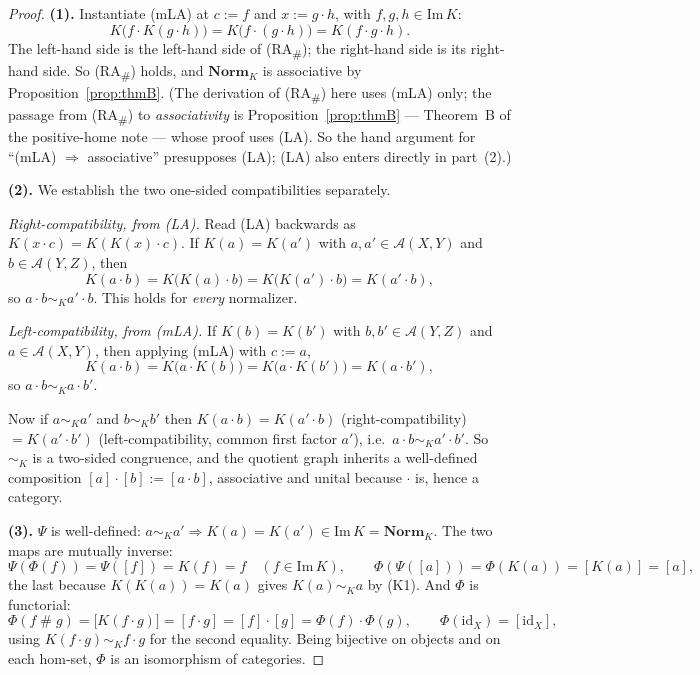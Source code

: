 \documentclass[11pt]{amsart}
\theoremstyle{plain}
\theoremstyle{definition}
\theoremstyle{remark}
\newcommand{\Norm}{\mathbf{Norm}}
\newcommand{\Img}{\mathrm{Im}\,}
\newcommand{\id}{\mathrm{id}}
\newcommand{\sh}{\mathbin{\#}}
\newcommand{\LA}{\textsf{(LA)}}
\newcommand{\mLA}{\textsf{(mLA)}}
\newcommand{\RA}{\textsf{(RA}\textsubscript{\#}\textsf{)}}
\newcommand{\simK}{\mathrel{\sim_{K}}}
\begin{document}
\begin{proof}
\textbf{(1).} Instantiate \mLA{} at $c:=f$ and $x:=g\cdot h$, with $f,g,h\in\Img K$:
\[
  K\big(f\cdot K(g\cdot h)\big)=K\big(f\cdot(g\cdot h)\big)=K(f\cdot g\cdot h).
\]
The left-hand side is the left-hand side of \RA{}; the right-hand side is its right-hand side. So
\RA{} holds, and $\Norm_K$ is associative by Proposition~\ref{prop:thmB}. (The derivation of \RA{}
here uses \mLA{} only; the passage from \RA{} to \emph{associativity} is Proposition~\ref{prop:thmB}
--- Theorem~B of the positive-home note --- whose proof uses \LA{}. So the hand argument for
``\mLA{} $\Rightarrow$ associative'' presupposes \LA{}; \LA{} also enters directly in part~(2).)

\textbf{(2).} We establish the two one-sided compatibilities separately.

\emph{Right-compatibility, from \LA{}.} Read \LA{} backwards as $K(x\cdot c)=K(K(x)\cdot c)$. If
$K(a)=K(a')$ with $a,a'\in\mathcal{A}(X,Y)$ and $b\in\mathcal{A}(Y,Z)$, then
\[
  K(a\cdot b)=K\big(K(a)\cdot b\big)=K\big(K(a')\cdot b\big)=K(a'\cdot b),
\]
so $a\cdot b\simK a'\cdot b$. This holds for \emph{every} normalizer.

\emph{Left-compatibility, from \mLA{}.} If $K(b)=K(b')$ with $b,b'\in\mathcal{A}(Y,Z)$ and
$a\in\mathcal{A}(X,Y)$, then applying \mLA{} with $c:=a$,
\[
  K(a\cdot b)=K\big(a\cdot K(b)\big)=K\big(a\cdot K(b')\big)=K(a\cdot b'),
\]
so $a\cdot b\simK a\cdot b'$.

Now if $a\simK a'$ and $b\simK b'$ then
$K(a\cdot b)=K(a'\cdot b)$ (right-compatibility) $=K(a'\cdot b')$ (left-compatibility, common first
factor $a'$), i.e.\ $a\cdot b\simK a'\cdot b'$. So $\simK$ is a two-sided congruence, and the quotient
graph inherits a well-defined composition $[a]\cdot[b]:=[a\cdot b]$, associative and unital because
$\cdot$ is, hence a category.

\textbf{(3).} $\Psi$ is well-defined: $a\simK a'\Rightarrow K(a)=K(a')\in\Img K=\Norm_K$. The two
maps are mutually inverse:
\[
  \Psi(\Phi(f))=\Psi([f])=K(f)=f\quad(f\in\Img K),\qquad
  \Phi(\Psi([a]))=\Phi(K(a))=[K(a)]=[a],
\]
the last because $K(K(a))=K(a)$ gives $K(a)\simK a$ by \textsf{(K1)}. And $\Phi$ is functorial:
\[
  \Phi(f\sh g)=\big[K(f\cdot g)\big]=[f\cdot g]=[f]\cdot[g]=\Phi(f)\cdot\Phi(g),\qquad
  \Phi(\id_X)=[\id_X],
\]
using $K(f\cdot g)\simK f\cdot g$ for the second equality. Being bijective on objects and on each
hom-set, $\Phi$ is an isomorphism of categories.
\end{proof}
\end{document}
